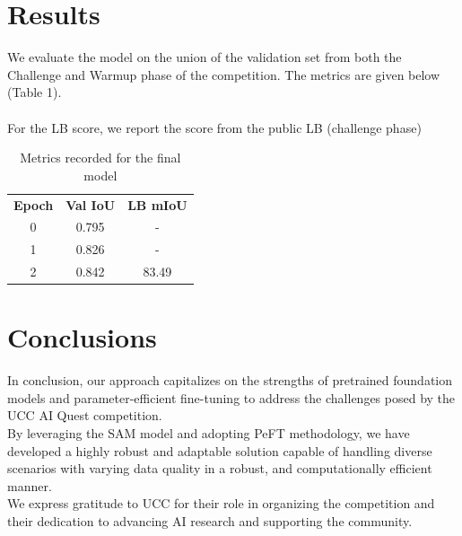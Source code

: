 \documentclass[conference]{IEEEtran}
\begin{document}
\section{Results}

We evaluate the model on the union of the validation set from both the Challenge and Warmup phase of the competition. The metrics are given below (Table 1).\\
\\
For the LB score, we report the score from the public LB (challenge phase)

\begin{table}[htbp]
\centering
\caption{Metrics recorded for the final model}
\label{tab:my_label}
\begin{tabular}{ccc}
\hline
\textbf{Epoch} & \textbf{Val IoU} & \textbf{LB mIoU} \\
0 & 0.795 & - \\
1 & 0.826 & - \\
2 & 0.842 & 83.49 \\
\hline
\end{tabular}
\end{table}
\section{Conclusions}
In conclusion, our approach capitalizes on the strengths of pretrained foundation models and parameter-efficient fine-tuning to address the challenges posed by the UCC AI Quest competition. \\

By leveraging the SAM model and adopting PeFT methodology, we have developed a highly robust and adaptable solution capable of handling diverse scenarios with varying data quality in a robust, and computationally efficient manner.\\

We express gratitude to UCC for their role in organizing the competition and their dedication to advancing AI research and supporting the community.
\end{document}
